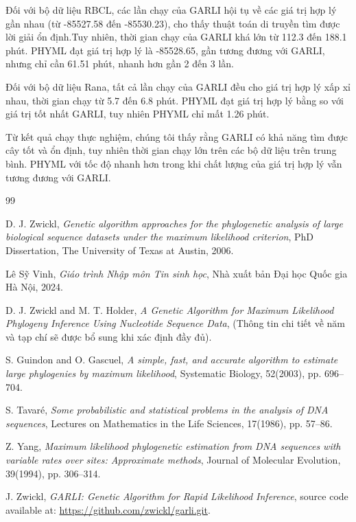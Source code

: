 \documentclass[12pt,a4paper]{report}
\begin{document}
Đối với bộ dữ liệu RBCL, các lần chạy của GARLI hội tụ về các giá trị hợp lý gần nhau (từ -85527.58 đến -85530.23), cho thấy thuật toán di truyền tìm được lời giải ổn định.Tuy nhiên, thời gian chạy của GARLI khá lớn từ 112.3 đến 188.1 phút. PHYML đạt giá trị hợp lý là -85528.65, gần tương đương với GARLI, nhưng chỉ cần 61.51 phút, nhanh hơn gần 2 đến 3 lần.

Đối với bộ dữ liệu Rana, tất cả lần chạy của GARLI đều cho giá trị hợp lý xấp xỉ nhau, thời gian chạy từ 5.7 đến 6.8 phút. PHYML đạt giá trị hợp lý bằng so với giá trị tốt nhất GARLI, tuy nhiên PHYML chỉ mất 1.26 phút.

Từ kết quả chạy thực nghiệm, chúng tôi thấy rằng GARLI có khả năng tìm được cây tốt và ổn định, tuy nhiên thời gian chạy lớn trên các bộ dữ liệu trên trung bình. PHYML với tốc độ nhanh hơn trong khi chất lượng của giá trị hợp lý vẫn tương đương với GARLI.





\newpage    


\begin{thebibliography}{99} %

D. J. Zwickl, {\it Genetic algorithm approaches for the phylogenetic analysis of large biological sequence datasets under the maximum likelihood criterion}, PhD Dissertation, The University of Texas at Austin, 2006.

Lê Sỹ Vinh, {\it Giáo trình Nhập môn Tin sinh học}, Nhà xuất bản Đại học Quốc gia Hà Nội, 2024.

D. J. Zwickl and M. T. Holder, {\it A Genetic Algorithm for Maximum Likelihood Phylogeny Inference Using Nucleotide Sequence Data}, (Thông tin chi tiết về năm và tạp chí sẽ được bổ sung khi xác định đầy đủ).

S. Guindon and O. Gascuel, {\it A simple, fast, and accurate algorithm to estimate large phylogenies by maximum likelihood}, Systematic Biology, 52(2003), pp. 696–704.

S. Tavaré, {\it Some probabilistic and statistical problems in the analysis of DNA sequences}, Lectures on Mathematics in the Life Sciences, 17(1986), pp. 57–86.

Z. Yang, {\it Maximum likelihood phylogenetic estimation from DNA sequences with variable rates over sites: Approximate methods}, Journal of Molecular Evolution, 39(1994), pp. 306–314.

J. Zwickl, {\it GARLI: Genetic Algorithm for Rapid Likelihood Inference}, source code available at: \url{https://github.com/zwickl/garli.git}.
\end{thebibliography}
\end{document}
